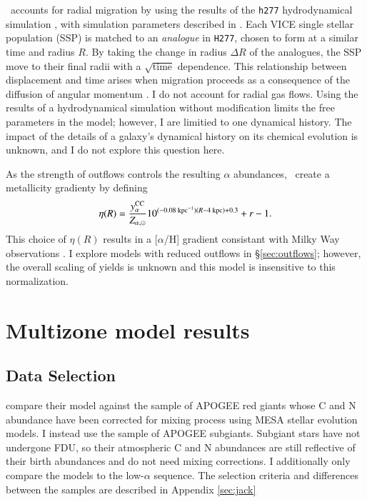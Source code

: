 \documentclass[12pt,oneside]{report}
\newcommand{\JJ}{\citetalias{james+21}}
\begin{document}
\JJ\ accounts for radial migration by using the results of the \texttt{h277} hydrodynamical simulation \citep{christensen12, zolotov12, loebman12, BZ14}, with simulation parameters described in \citet{bird+21}. Each VICE single stellar population (SSP) is matched to an \textit{analogue} in \texttt{H277}, chosen to form at a similar time and radius $R$. By taking the change in radius $\Delta R$ of the analogues, the SSP move to their final radii with a $\sqrt{\text{time}}$ dependence.
This relationship between displacement and time arises when migration proceeds as a consequence of the diffusion of angular momentum \citep{frankel18, frankel20}.
I do not account for radial gas flows.
Using the results of a hydrodynamical simulation without modification limits the free parameters in the model; however, I are limitied to one dynamical history. The impact of the details of a galaxy's dynamical history on its chemical evolution is unknown, and I do not explore this question here.

As the strength of outflows controls the resulting $\alpha$ abundances, \JJ~create a metallicity gradienty by defining
\begin{equation}
\eta(R) = \frac{y_{\alpha}^{\rm CC}}{Z_{\alpha, \odot}} 10^{(-0.08\text{ kpc}^{-1})(R-4\text{ kpc})+0.3} + r - 1.
\end{equation}
This choice of $\eta(R)$ results in a [$\alpha$/H] gradient consistant with Milky Way observations \citep{james+21}. I explore models with reduced outflows in \S\ref{sec:outflows}; however, the overall scaling of yields is unknown and this model is insensitive to this normalization.


\chapter{Multizone model results}
\section{Data Selection}

\citet{james+22} compare their model against the \cite{fiorenzo+21} sample of APOGEE \citet{apogee17} red giants whose C and N abundance have been corrected for mixing process using MESA stellar evolution models. 
I instead use the \citet{jack_subgiant} sample of APOGEE subgiants. Subgiant stars have not undergone FDU, so their atmospheric C and N abundances are still reflective of their birth abundances and do not need mixing corrections. I additionally only compare the models to the low-$\alpha$ sequence.  The selection criteria and differences between the samples are described in Appendix \ref{sec:jack}
\end{document}
